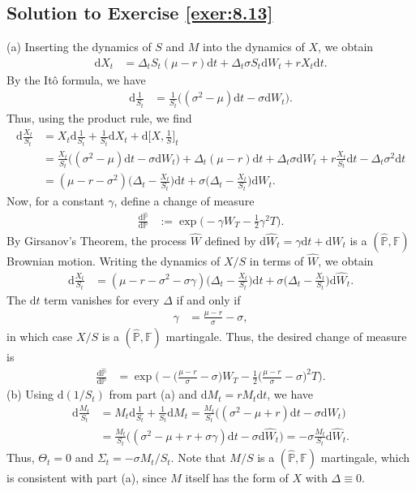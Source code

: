 \documentclass[12pt]{book}
\numberwithin{equation}{chapter}
\theoremstyle{plain}
\numberwithin{theorem}{section}
\theoremstyle{definition}
\numberwithin{exercise}{chapter}
\newcommand{\<}{\langle}
\renewcommand{\>}{\rangle}
\renewcommand{\(}{\left(}
\renewcommand{\)}{\right)}
\renewcommand{\[}{\left[}
\renewcommand{\]}{\right]}
\newcommand\Fb{\mathds{F}}
\newcommand\Pb{\mathds{P}}
\newcommand\sig{\sigma}
\newcommand\Sig{\Sigma}
\newcommand\gam{\gamma}
\newcommand\Del{\Delta}
\newcommand\Pbh{\widehat{\Pb}}
\newcommand\Wh{\widehat{W}}
\newcommand\dd{\mathrm{d}}
\begin{document}
\subsection*{Solution to Exercise \ref{exer:8.13}}
(a) Inserting the dynamics of $S$ and $M$ into the dynamics of $X$, we obtain
\begin{align}
\dd X_t
	&=	\Del_t S_t ( \mu - r ) \dd t + \Del_t \sig S_t \dd W_t + r X_t \dd t .
\end{align}
By the It\^o formula, we have
\begin{align}
\dd \frac{1}{S_t}
	&=	\frac{1}{S_t} \Big( ( \sig^2 - \mu ) \dd t - \sig \dd W_t \Big) .
\end{align}
Thus, using the product rule, we find
\begin{align}
\dd \frac{X_t}{S_t}
	&=	X_t \dd \frac{1}{S_t} + \frac{1}{S_t} \dd X_t + \dd \Big[ X , \frac{1}{S} \Big]_t \\
	&=	\frac{X_t}{S_t} \Big( ( \sig^2 - \mu ) \dd t - \sig \dd W_t \Big)
			+ \Del_t ( \mu - r ) \dd t + \Del_t \sig \dd W_t + r \frac{X_t}{S_t} \dd t - \Del_t \sig^2 \dd t \\
	&=	( \mu - r - \sig^2 ) \Big( \Del_t - \frac{X_t}{S_t} \Big) \dd t + \sig \Big( \Del_t - \frac{X_t}{S_t} \Big) \dd W_t .
\end{align}
Now, for a constant $\gam$, define a change of measure
\begin{align}
\frac{\dd \Pbh}{\dd \Pb}
	&:=	\exp \Big( - \gam W_T - \tfrac{1}{2} \gam^2 T \Big) .
\end{align}
By Girsanov's Theorem, the process $\Wh$ defined by $\dd \Wh_t = \gam \dd t + \dd W_t$ is a $(\Pbh,\Fb)$ Brownian motion.  Writing the dynamics of $X/S$ in terms of $\Wh$, we obtain
\begin{align}
\dd \frac{X_t}{S_t}
	&=	( \mu - r - \sig^2 - \sig \gam ) \Big( \Del_t - \frac{X_t}{S_t} \Big) \dd t + \sig \Big( \Del_t - \frac{X_t}{S_t} \Big) \dd \Wh_t .
\end{align}
The $\dd t$ term vanishes for every $\Del$ if and only if
\begin{align}
\gam
	&=	\frac{\mu - r}{\sig} - \sig ,
\end{align}
in which case $X/S$ is a $(\Pbh,\Fb)$ martingale.  Thus, the desired change of measure is
\begin{align}
\frac{\dd \Pbh}{\dd \Pb}
	&=	\exp \Big( - \Big( \frac{\mu - r}{\sig} - \sig \Big) W_T - \frac{1}{2} \Big( \frac{\mu - r}{\sig} - \sig \Big)^2 T \Big) .
\end{align}
(b) Using $\dd (1/S_t)$ from part (a) and $\dd M_t = r M_t \dd t$, we have
\begin{align}
\dd \frac{M_t}{S_t}
	&=	M_t \dd \frac{1}{S_t} + \frac{1}{S_t} \dd M_t
	=		\frac{M_t}{S_t} \Big( ( \sig^2 - \mu + r ) \dd t - \sig \dd W_t \Big) \\
	&=	\frac{M_t}{S_t} \Big( ( \sig^2 - \mu + r + \sig \gam ) \dd t - \sig \dd \Wh_t \Big)
	=		- \sig \frac{M_t}{S_t} \dd \Wh_t .
\end{align}
Thus, $\Theta_t = 0$ and $\Sig_t = - \sig M_t / S_t$.  Note that $M/S$ is a $(\Pbh,\Fb)$ martingale, which is consistent with part (a), since $M$ itself has the form of $X$ with $\Del \equiv 0$.
\end{document}
